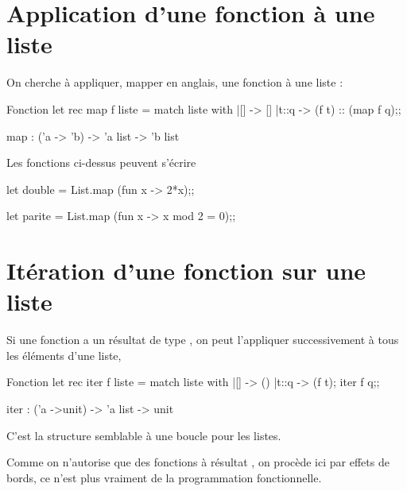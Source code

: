 \section{Application d'une fonction à une liste}
On cherche à appliquer, {\sc mapper} en anglais, une fonction à une liste :
\begin{code}{Fonction }
let rec map f liste = 
   match liste with
   |[] -> []
   |t::q -> (f t) :: (map f q);;
   
map : ('a -> 'b) -> 'a list -> 'b list
\end{code}
\newpage
Les fonctions ci-dessus peuvent s'écrire

\begin{ocaml}
let double = List.map (fun x -> 2*x);;

let parite = List.map (fun x -> x mod 2 = 0);;
\end{ocaml} 
\section{Itération d'une fonction sur une liste}
Si une fonction a un résultat de type , on peut l'appliquer  successivement à  tous les éléments d'une liste,  %
\begin{code}{Fonction }
let rec iter f liste = 
   match liste with
   |[] -> ()
   |t::q -> (f t);
            iter f q;;
   
iter : ('a ->unit) -> 'a list -> unit
\end{code}

C'est la structure semblable à une boucle  pour les listes. 

Comme on n'autorise que des fonctions à résultat , on procède ici par effets de bords, ce n'est plus vraiment de la programmation fonctionnelle.
